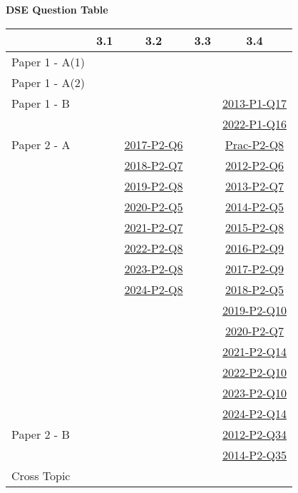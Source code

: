 \documentclass[12pt, a4paper]{article}
\begin{document}
\begin{absolutelynopagebreak}
\begin{center}
\textbf{DSE Question Table}
\end{center}
\begin{center}
\begin{tabular}{|l|c|c|c|c|}
\hline
        & 3.1 & 3.2 & 3.3 & 3.4 \\\hline
\hline
Paper 1 - A(1)&  &  &  &  \\
\hline
Paper 1 - A(2)&  &  &  &  \\
\hline
Paper 1 - B&  &  &  & \hyperref[DSE2013-CoreP1-Q17]{2013-P1-Q17} \\
&  &  &  & \hyperref[DSE2022-CoreP1-Q16]{2022-P1-Q16} \\
\hline
\hline
Paper 2 - A&  & \hyperref[DSE2017-CoreP2-Q06]{2017-P2-Q6} &  & \hyperref[DSE2012P-CoreP2-Q08]{Prac-P2-Q8} \\
&  & \hyperref[DSE2018-CoreP2-Q07]{2018-P2-Q7} &  & \hyperref[DSE2012-CoreP2-Q06]{2012-P2-Q6} \\
&  & \hyperref[DSE2019-CoreP2-Q08]{2019-P2-Q8} &  & \hyperref[DSE2013-CoreP2-Q07]{2013-P2-Q7} \\
&  & \hyperref[DSE2020-CoreP2-Q05]{2020-P2-Q5} &  & \hyperref[DSE2014-CoreP2-Q05]{2014-P2-Q5} \\
&  & \hyperref[DSE2021-CoreP2-Q07]{2021-P2-Q7} &  & \hyperref[DSE2015-CoreP2-Q08]{2015-P2-Q8} \\
&  & \hyperref[DSE2022-CoreP2-Q08]{2022-P2-Q8} &  & \hyperref[DSE2016-CoreP2-Q09]{2016-P2-Q9} \\
&  & \hyperref[DSE2023-CoreP2-Q08]{2023-P2-Q8} &  & \hyperref[DSE2017-CoreP2-Q09]{2017-P2-Q9} \\
&  & \hyperref[DSE2024-CoreP2-Q08]{2024-P2-Q8} &  & \hyperref[DSE2018-CoreP2-Q05]{2018-P2-Q5} \\
&  &  &  & \hyperref[DSE2019-CoreP2-Q10]{2019-P2-Q10} \\
&  &  &  & \hyperref[DSE2020-CoreP2-Q07]{2020-P2-Q7} \\
&  &  &  & \hyperref[DSE2021-CoreP2-Q14]{2021-P2-Q14} \\
&  &  &  & \hyperref[DSE2022-CoreP2-Q10]{2022-P2-Q10} \\
&  &  &  & \hyperref[DSE2023-CoreP2-Q10]{2023-P2-Q10} \\
&  &  &  & \hyperref[DSE2024-CoreP2-Q14]{2024-P2-Q14} \\
\hline
Paper 2 - B&  &  &  & \hyperref[DSE2012-CoreP2-Q34]{2012-P2-Q34} \\
&  &  &  & \hyperref[DSE2014-CoreP2-Q35]{2014-P2-Q35} \\
\hline
\hline
Cross Topic&  &  &  &  \\
\hline
\end{tabular}
\end{center}
\end{absolutelynopagebreak}
\end{document}
